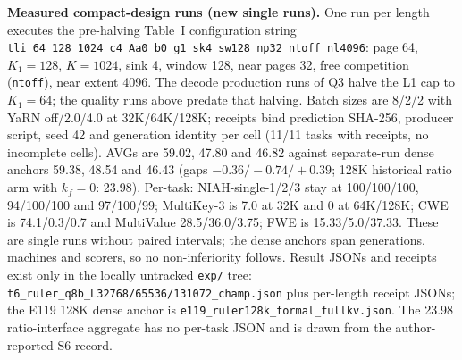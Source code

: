\documentclass[10pt,letterpaper]{article}
\begin{document}
\par\medskip\noindent\textbf{Measured compact-design runs (new single runs).} One run per length executes the pre-halving Table~I configuration string \texttt{tli\_64\_128\_1024\_c4\_\allowbreak Aa0\_b0\_g1\_\allowbreak sk4\_sw128\_\allowbreak np32\_ntoff\_nl4096}: page 64, $K_1{=}128$, $K{=}1024$, sink 4, window 128, near pages 32, free competition (\texttt{ntoff}), near extent 4096. The decode production runs of Q3 halve the L1 cap to $K_1{=}64$; the quality runs above predate that halving. Batch sizes are 8/2/2 with YaRN off/2.0/4.0 at 32K/64K/128K; receipts bind prediction SHA-256, producer script, seed 42 and generation identity per cell (11/11 tasks with receipts, no incomplete cells). AVGs are 59.02, 47.80 and 46.82 against separate-run dense anchors 59.38, 48.54 and 46.43 (gaps $-0.36/-0.74/+0.39$; 128K historical ratio arm with $k_f=0$: 23.98). Per-task: NIAH-single-1/2/3 stay at 100/100/100, 94/100/100 and 97/100/99; MultiKey-3 is 7.0 at 32K and 0 at 64K/128K; CWE is 74.1/0.3/0.7 and MultiValue 28.5/36.0/3.75; FWE is 15.33/5.0/37.33. These are single runs without paired intervals; the dense anchors span generations, machines and scorers, so no non-inferiority follows. Result JSONs and receipts exist only in the locally untracked \texttt{exp/} tree: \texttt{t6\_\allowbreak ruler\_\allowbreak q8b\_\allowbreak L32768/65536/131072\_\allowbreak champ.json} plus per-length receipt JSONs; the E119 128K dense anchor is \texttt{e119\_\allowbreak ruler128k\_\allowbreak formal\_\allowbreak fullkv.json}. The 23.98 ratio-interface aggregate has no per-task JSON and is drawn from the author-reported S6 record.
\end{document}
